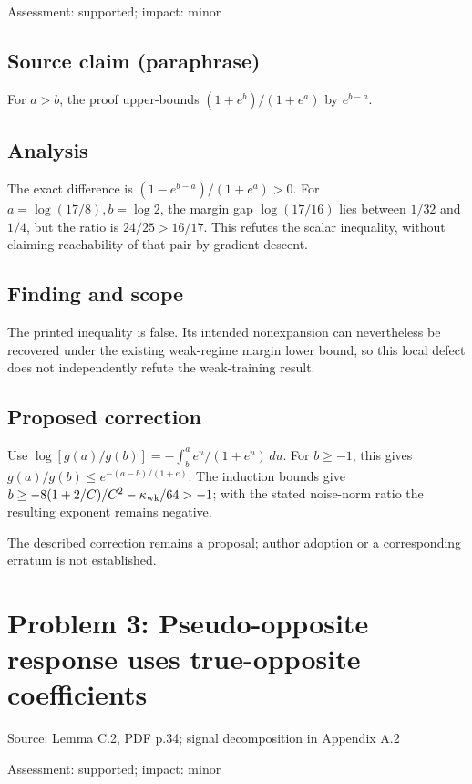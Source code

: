 \documentclass[11pt]{article}
\begin{document}
Assessment: supported; impact: minor

\subsection*{Source claim (paraphrase)}

For \(a>b\), the proof upper-bounds \((1+e^b)/(1+e^a)\) by \(e^{b-a}\).

\subsection*{Analysis}

The exact difference is \((1-e^{b-a})/(1+e^a)>0\). For \(a=\log(17/8),b=\log2\), the margin gap \(\log(17/16)\) lies between \(1/32\) and \(1/4\), but the ratio is \(24/25>16/17\). This refutes the scalar inequality, without claiming reachability of that pair by gradient descent.

\subsection*{Finding and scope}

The printed inequality is false. Its intended nonexpansion can nevertheless be recovered under the existing weak-regime margin lower bound, so this local defect does not independently refute the weak-training result.

\subsection*{Proposed correction}

Use \(\log[g(a)/g(b)]=-\int_b^a e^u/(1+e^u)\,du\). For \(b\geq-1\), this gives \(g(a)/g(b)\leq e^{-(a-b)/(1+e)}\). The induction bounds give \(b\geq-8(1+2/C)/C^2-\kappa_{\rm wk}/64>-1\); with the stated noise-norm ratio the resulting exponent remains negative.

The described correction remains a proposal; author adoption or a corresponding erratum is not established.

\section*{Problem 3: Pseudo-opposite response uses true-opposite coefficients}

Source: Lemma C.2, PDF p.34; signal decomposition in Appendix A.2

Assessment: supported; impact: minor
\end{document}
